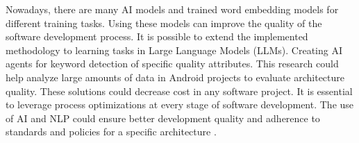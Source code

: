 Nowadays, there are many AI models and trained word embedding models for different training tasks. Using these models can improve the quality of the software development process. It is possible to extend the implemented methodology to learning tasks in Large Language Models (LLMs). Creating AI agents for keyword detection of specific quality attributes. This research could help analyze large amounts of data in Android projects to evaluate architecture quality. These solutions could decrease cost in any software project. It is essential to leverage process optimizations at every stage of software development. The use of AI and NLP could ensure better development quality and adherence to standards and policies for a specific architecture \cite{future_work1,future_work2}.




